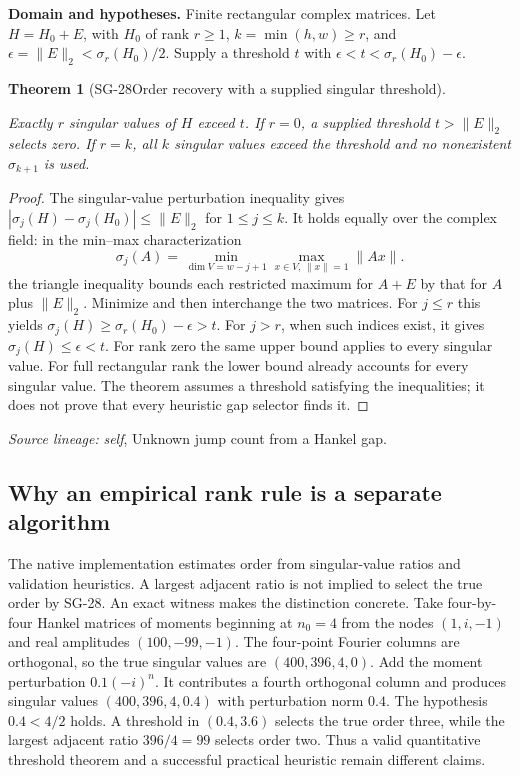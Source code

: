 \documentclass[11pt]{article}
\newtheorem{theorem}{Theorem}[section]
\theoremstyle{definition}\newtheorem{definition}[theorem]{Definition}
\theoremstyle{remark}\newtheorem{remark}[theorem]{Remark}
\begin{document}
\par{\small\textbf{Domain and hypotheses.} Finite rectangular complex matrices. Let $H=H_0+E$, with $H_0$ of rank $r\ge1$, $k=\min(h,w)\ge r$, and $\epsilon=\|E\|_2<\sigma_r(H_0)/2$. Supply a threshold $t$ with $\epsilon<t<\sigma_r(H_0)-\epsilon$.}\par
\begin{theorem}[SG-28\quad Order recovery with a supplied singular threshold]\label{SG-28}

Exactly $r$ singular values of $H$ exceed $t$. If $r=0$, a supplied
threshold $t>\|E\|_2$ selects zero. If $r=k$, all $k$ singular values exceed
the threshold and no nonexistent $\sigma_{k+1}$ is used.

\end{theorem}
\begin{proof}

The singular-value perturbation inequality \cite{stewart} gives
$|\sigma_j(H)-\sigma_j(H_0)|\le\|E\|_2$ for $1\le j\le k$.
It holds equally over the complex field: in the min--max characterization
\[
 \sigma_j(A)=\min_{\dim V=w-j+1}\max_{x\in V,\,\|x\|=1}\|Ax\|.
\]
the triangle inequality bounds each restricted maximum for $A+E$ by that
for $A$ plus $\|E\|_2$. Minimize and then interchange the two matrices.
For $j\le r$ this yields $\sigma_j(H)\ge\sigma_r(H_0)-\epsilon>t$.
For $j>r$, when such indices exist, it gives $\sigma_j(H)\le\epsilon<t$.
For rank zero the same upper bound applies to every singular value. For full
rectangular rank the lower bound already accounts for every singular value.
The theorem assumes a threshold satisfying the inequalities; it does not
prove that every heuristic gap selector finds it.

\end{proof}

\par{\small\color{Teal}\textit{Source lineage:} \textit{self}, Unknown jump count from a Hankel gap.}\par

\subsection{Why an empirical rank rule is a separate algorithm}

The native implementation estimates order from singular-value ratios and
validation heuristics. A largest adjacent ratio is not implied to select the
true order by SG-28. An exact witness makes the distinction concrete. Take
four-by-four Hankel matrices of moments beginning at $n_0=4$ from the nodes
$(1,i,-1)$ and real amplitudes $(100,-99,-1)$. The four-point Fourier columns
are orthogonal, so the true singular values are $(400,396,4,0)$. Add the
moment perturbation $0.1(-i)^n$. It contributes a fourth orthogonal column and
produces singular values $(400,396,4,0.4)$ with perturbation norm $0.4$.
The hypothesis $0.4<4/2$ holds. A threshold in $(0.4,3.6)$ selects the true
order three, while the largest adjacent ratio $396/4=99$ selects order two.
Thus a valid quantitative threshold theorem and a successful practical
heuristic remain different claims.
\end{document}
